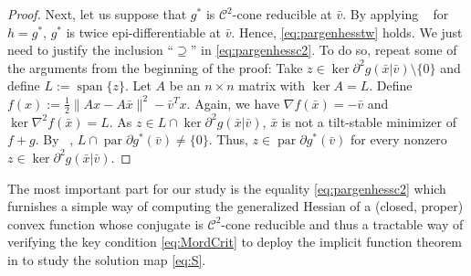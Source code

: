 \documentclass[reqno]{amsart}
\newtheorem{definition}[proposition]{Definition}
\numberwithin{equation}{section}
\newcommand{\R}{\mathbb{R}}
\newcommand{\X}{\mathbb{X}}
\newcommand{\x}{\bar{x}}
\newcommand{\argmin}{\operatorname{argmin}}
\begin{document}
\begin{proof}
    Next, let us suppose that $g^*$ is $\mathcal{C}^2$-cone reducible at $\bar{v}$.  By applying ~ for $h=g^*$, $g^*$ is twice epi-differentiable at $\bar{v}$. Hence, \eqref{eq:pargenhesstw} holds. We just need to justify the  inclusion ``$\supseteq$'' in \eqref{eq:pargenhessc2}. To do so, repeat some of the arguments from the beginning of the proof: 
    Take $z \in \ker \partial^2 g(\x | \bar{v}) \setminus \{0\}$ and define $L := \operatorname{span}\{z\}$.
    Let $A$ be an $n\times n$ matrix with $\ker A = L$. Define $f(x) := \frac{1}{2} \lVert Ax - A\bar{x} \rVert^2 -  \bar v^T x$.
    Again, we have $\nabla f(\x) = -\bar{v}$ and $\ker \nabla^2 f(\x) = L$. As $z \in L \cap \ker \partial^2 g(\x | \bar{v})$, $\x$ is
    not a tilt-stable minimizer of $f + g$. By ~, $L \cap \operatorname{par} \partial g^*(\bar{v}) \not = \{0\}$. Thus, $z \in \operatorname{par} \partial g^* (\bar{v})$
    for every nonzero $z \in \ker \partial^2 g(\bar{x} | \bar{v})$.
\end{proof}


\noindent
The most important part for our study is the equality \eqref{eq:pargenhessc2} which furnishes a simple way of computing the generalized Hessian of a (closed, proper) convex function whose conjugate is $\mathcal{C}^2$-cone reducible and thus a tractable way of verifying the key condition  \eqref{eq:MordCrit} to deploy the implicit function theorem in  to study the solution map \eqref{eq:S}.






\end{document}
